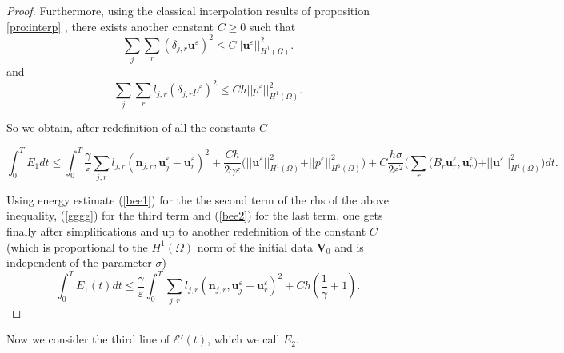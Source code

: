 \documentclass[a4paper,french,english,10pt]{article}
\newcommand\uu{\mathbf{u}}
\newcommand\eps{\varepsilon}
\newcommand\V{\mathbf{V}}
\begin{document}
\begin{proof}
Furthermore, using the  classical interpolation results of proposition \ref{pro:interp} , there exists another constant $C\geq0$ such that 
\[
\sum_j \sum_r ( \delta_{j,r}\uu^{\eps})^2 \leq C \vert \vert \uu^\eps \vert\vert^2_{H^1(\Omega)}
.
\]
and
\[
\sum_j \sum_r l_{j,r} ( \delta_{j,r}p^{\eps})^2 \leq C h \vert \vert p^\eps \vert\vert^2_{H^1(\Omega)}
.
\]

So we obtain, after redefinition of all the constants $C$ 

$$
\int_0^T E_1 dt\leq 
\int_0^T \frac{\gamma}{\eps}
\sum_{j,r}l_{j,r}(\textbf{n}_{j,r},\textbf{u}_j^{\eps}-\textbf{u}
_r^{\eps})^2 
+\frac {Ch }{2\gamma \eps}\bigg(\vert \vert \uu^\eps \vert\vert^2_{H^1(\Omega)} +\vert \vert p^\eps \vert\vert^2_{H^1(\Omega)}  \bigg)
+C \frac{h\sigma}{2\eps^2}
\bigg(\sum_r \big( B_{r}\mathbf{u}_r^{\eps},\mathbf{u}_r^{\eps}\big) +  \vert \vert \uu^\eps \vert\vert^2_{H^1(\Omega)}\bigg)dt.
$$



Using  energy estimate (\ref{bee1})  for the the second  term of the rhs of the above inequality,    (\ref{gggg}) for the third term   and   (\ref{bee2}) for the last term,
one gets finally after simplifications and up to another redefinition  of the constant $C$(which is proportional to the $H^1(\Omega)$ norm of the initial data $\V_0$ and  is independent of the parameter $\sigma$)
\begin{equation} \label{eq:si1}
\int_0^T E_1(t)dt \leq 
\frac{\gamma}{\eps}\int_0^T\sum_{j,r}l_{j,r}(\textbf{n}_{j,r},\textbf{u}_j^{\eps}-\textbf{u}
_r^{\eps})^2 
+Ch(  \frac 1 {\gamma } +1).
\end{equation}
\end{proof}


Now we consider the third line 
of  $\mathscr{E}'(t)$, which we call $E_2$.
\end{document}
